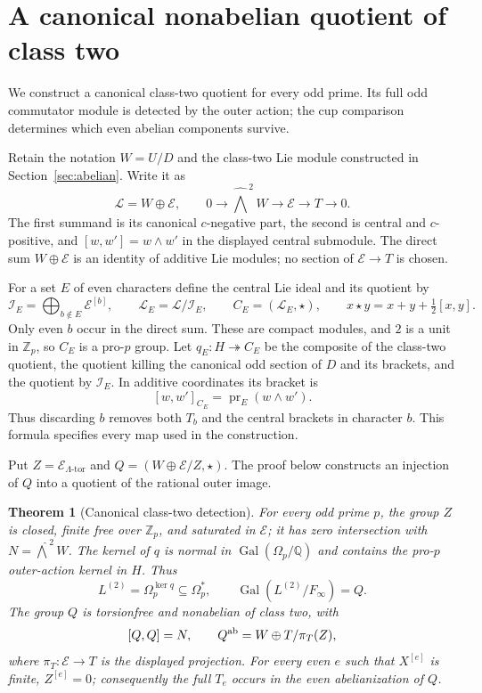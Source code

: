 \documentclass[11pt]{article}
\newtheorem{theorem}{Theorem}[section]
\theoremstyle{definition}\newtheorem{definition}[theorem]{Definition}
\begin{document}

\section{A canonical nonabelian quotient of class two}
\label{sec:class-two-components}

We construct a canonical class-two quotient for every odd prime.
Its full odd commutator module is detected by the outer action;
the cup comparison determines which even abelian components survive.

Retain the notation $W=U/D$ and the class-two Lie module constructed
in Section~\ref{sec:abelian}.  Write it as
\[
 \mathcal L=W\oplus\mathcal E,\qquad
 0\longrightarrow\widehat{\bigwedge}^{\,2}W
 \longrightarrow\mathcal E\longrightarrow T\longrightarrow0.
\]
The first summand is its canonical $c$-negative part, the second is
central and $c$-positive, and $[w,w']=w\wedge w'$ in the displayed
central submodule.  The direct sum $W\oplus\mathcal E$ is an
identity of additive Lie modules; no section of
$\mathcal E\to T$ is chosen.

For a set $E$ of even characters define the central Lie ideal
and its quotient by
\[
 \mathcal I_E=\bigoplus_{b\notin E}\mathcal E^{[b]},\qquad
 \mathcal L_E=\mathcal L/\mathcal I_E,
 \qquad C_E=(\mathcal L_E,\star),\qquad
 x\star y=x+y+\tfrac12[x,y].
\]
Only even $b$ occur in the direct sum.  These are compact modules,
and $2$ is a unit in $\mathbb Z_p$, so $C_E$ is a pro-$p$ group.
Let $q_E:H\twoheadrightarrow C_E$ be the composite of the
class-two quotient, the quotient killing the canonical odd section
of $D$ and its brackets, and the quotient by $\mathcal I_E$.
In additive coordinates its bracket is
\[
 [w,w']_{C_E}=\operatorname{pr}_E(w\wedge w').
\]
Thus discarding $b$ removes both $T_b$ and the central brackets
in character $b$.  This formula specifies every map used in the
construction.

Put $Z=\mathcal E_{\Lambda\text{-tor}}$ and
$Q=(W\oplus\mathcal E/Z,\star)$. The proof below constructs
an injection of $Q$ into a quotient of the rational outer image.


\begin{theorem}[Canonical class-two detection]
\label{thm:canonical-torsion-quotient}
For every odd prime $p$, the group $Z$ is closed, finite free
 over $\mathbb Z_p$, and saturated in $\mathcal E$; it has
zero intersection with $N=\widehat{\bigwedge}^{\,2}W$.
The kernel of $q$ is normal in $\operatorname{Gal}(\Omega_p/\mathbb Q)$
and contains the pro-$p$ outer-action kernel in $H$. Thus
\[
 L^{(2)}=\Omega_p^{\ker q}\subseteq\Omega_p^*,\qquad
 \operatorname{Gal}(L^{(2)}/F_\infty)=Q.
\]
The group $Q$ is torsionfree and nonabelian of class two, with
\[
 [Q,Q]=N,\qquad Q^{\rm ab}=W\oplus T/\pi_T(Z),
\]
where $\pi_T:\mathcal E\to T$ is the displayed projection.
For every even $e$ such that $X^{[e]}$ is finite,
$Z^{[e]}=0$; consequently the full $T_e$ occurs in the even
abelianization of $Q$.
\end{theorem}
\end{document}
